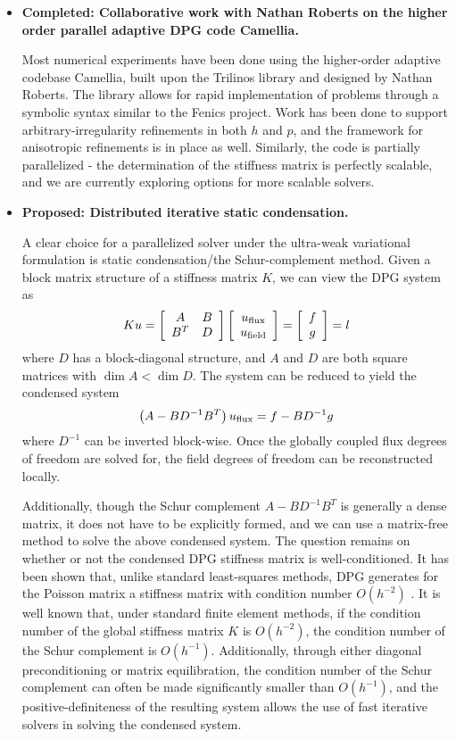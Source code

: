 \begin{itemize}
\item{\textbf{Completed: Collaborative work with Nathan Roberts on the higher order parallel adaptive DPG code Camellia.}}

Most numerical experiments have been done using the higher-order adaptive codebase Camellia, built upon the Trilinos library and designed by Nathan Roberts. The library allows for rapid implementation of problems through a symbolic syntax similar to the Fenics project. Work has been done to support arbitrary-irregularity refinements in both $h$ and $p$, and the framework for anisotropic refinements is in place as well. Similarly, the code is partially parallelized - the determination of the stiffness matrix is perfectly scalable, and we are currently exploring options for more scalable solvers. 

\item{\textbf{Proposed: Distributed iterative static condensation.}}

A clear choice for a parallelized solver under the ultra-weak variational formulation is static condensation/the Schur-complement method. Given a block matrix structure of a stiffness matrix $K$, we can view the DPG system as
\[
Ku = \arr{A}{B}{B^T}{D}\vecttwo{u_{\rm flux}}{u_{\rm field}} = \vecttwo{f}{g} = l
\]
where $D$ has a block-diagonal structure, and $A$ and $D$ are both square matrices with $\dim{A} < \dim{D}$. The system can be reduced to yield the condensed system
\[
\left(A-B D^{-1} B^T\right)u_{\rm flux} = f - B D^{-1} g
\]
where $D^{-1}$ can be inverted block-wise. Once the globally coupled flux degrees of freedom are solved for, the field degrees of freedom can be reconstructed locally. 

Additionally, though the Schur complement $A-B D^{-1} B^T$ is generally a dense matrix, it does not have to be explicitly formed, and we can use a matrix-free method to solve the above condensed system. The question remains on whether or not the condensed DPG stiffness matrix is well-conditioned. It has been shown that, unlike standard least-squares methods, DPG generates for the Poisson matrix a stiffness matrix with condition number $O(h^{-2})$ \cite{practicalDPG}. It is well known that, under standard finite element methods, if the condition number of the global stiffness matrix $K$ is $O(h^{-2})$, the condition number of the Schur complement is $O(h^{-1})$. Additionally, through either diagonal preconditioning or matrix equilibration, the condition number of the Schur complement can often be made significantly smaller than $O(h^{-1})$, and the positive-definiteness of the resulting system allows the use of fast iterative solvers in solving the condensed system. 


\end{itemize}
